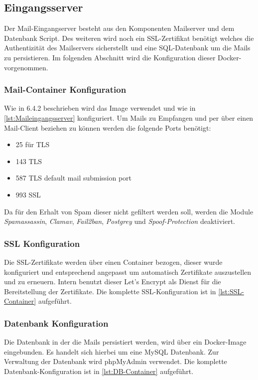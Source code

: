 \documentclass[a4paper,11pt,singlespacing]{article}
\begin{document}
	\subsection{Eingangsserver}\label{sec:UmsetzungEingangsserver}
		Der Mail-Eingangserver besteht aus den Komponenten Mailserver und dem Datenbank Script.
		Des weiteren wird noch ein SSL-Zertifikat benötigt welches die Authentizität des Mailservers sicherstellt und eine SQL-Datenbank um die Mails zu persistieren.
		Im folgenden Abschnitt wird die Konfiguration dieser Docker- vorgenommen.

		\subsubsection{Mail-Container Konfiguration}\label{Mail-In-Container}
			Wie in 6.4.2 beschrieben wird das Image verwendet und wie in \autoref{lst:Maileingangsserver} konfiguriert.
			Um Mails zu Empfangen und per  über einen Mail-Client beziehen zu können werden die folgende Ports benötigt:
			\begin{itemize}
				\item 25 für TLS 
				\item 143 TLS 
				\item 587 TLS default mail submission port
				\item 993 SSL 
			\end{itemize}
			Da für den Erhalt von Spam dieser nicht gefiltert werden soll, werden die Module \textit{Spamassassin}, \textit{Clamav}, \textit{Fail2ban}, \textit{Postgrey} und \textit{Spoof-Protection} deaktiviert.
			
		\subsubsection{SSL Konfiguration}\label{SSL-Container}
			Die SSL-Zertifikate werden über einen Container bezogen, dieser wurde konfiguriert und entsprechend angepasst um automatisch Zertifikate auszustellen und zu erneuern.
			Intern benutzt dieser Let's Encrypt als Dienst für die Bereitstellung der Zertifikate.
			Die komplette SSL-Konfiguration ist in \autoref{lst:SSL-Container} aufgeführt.

		\subsubsection{Datenbank Konfiguration}\label{DB-Container}
			Die Datenbank in der die Mails persistiert werden, wird über ein Docker-Image eingebunden.
			Es handelt sich hierbei um eine MySQL Datenbank.
			Zur Verwaltung der Datenbank wird phpMyAdmin verwendet.
			Die komplette Datenbank-Konfiguration ist in \autoref{lst:DB-Container} aufgeführt.
\end{document}
